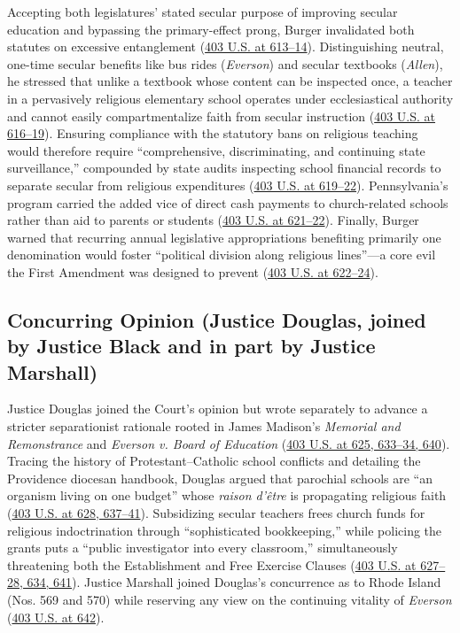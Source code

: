 \documentclass[12pt]{article}
\begin{document}
Accepting both legislatures' stated secular purpose of improving secular education and bypassing the primary-effect prong, Burger invalidated both statutes on excessive entanglement (\href{https://supreme.justia.com/cases/federal/us/403/602/}{403 U.S. at 613--14}). Distinguishing neutral, one-time secular benefits like bus rides (\textit{Everson}) and secular textbooks (\textit{Allen}), he stressed that unlike a textbook whose content can be inspected once, a teacher in a pervasively religious elementary school operates under ecclesiastical authority and cannot easily compartmentalize faith from secular instruction (\href{https://supreme.justia.com/cases/federal/us/403/602/}{403 U.S. at 616--19}). Ensuring compliance with the statutory bans on religious teaching would therefore require ``comprehensive, discriminating, and continuing state surveillance,'' compounded by state audits inspecting school financial records to separate secular from religious expenditures (\href{https://supreme.justia.com/cases/federal/us/403/602/}{403 U.S. at 619--22}). Pennsylvania's program carried the added vice of direct cash payments to church-related schools rather than aid to parents or students (\href{https://supreme.justia.com/cases/federal/us/403/602/}{403 U.S. at 621--22}). Finally, Burger warned that recurring annual legislative appropriations benefiting primarily one denomination would foster ``political division along religious lines''---a core evil the First Amendment was designed to prevent (\href{https://supreme.justia.com/cases/federal/us/403/602/}{403 U.S. at 622--24}).

\subsection{Concurring Opinion (Justice Douglas, joined by Justice Black and in part by Justice Marshall)}
Justice Douglas joined the Court's opinion but wrote separately to advance a stricter separationist rationale rooted in James Madison's \textit{Memorial and Remonstrance} and \textit{Everson v. Board of Education} (\href{https://supreme.justia.com/cases/federal/us/403/602/}{403 U.S. at 625, 633--34, 640}). Tracing the history of Protestant--Catholic school conflicts and detailing the Providence diocesan handbook, Douglas argued that parochial schools are ``an organism living on one budget'' whose \textit{raison d'\^{e}tre} is propagating religious faith (\href{https://supreme.justia.com/cases/federal/us/403/602/}{403 U.S. at 628, 637--41}). Subsidizing secular teachers frees church funds for religious indoctrination through ``sophisticated bookkeeping,'' while policing the grants puts a ``public investigator into every classroom,'' simultaneously threatening both the Establishment and Free Exercise Clauses (\href{https://supreme.justia.com/cases/federal/us/403/602/}{403 U.S. at 627--28, 634, 641}). Justice Marshall joined Douglas's concurrence as to Rhode Island (Nos. 569 and 570) while reserving any view on the continuing vitality of \textit{Everson} (\href{https://supreme.justia.com/cases/federal/us/403/602/}{403 U.S. at 642}).
\end{document}
